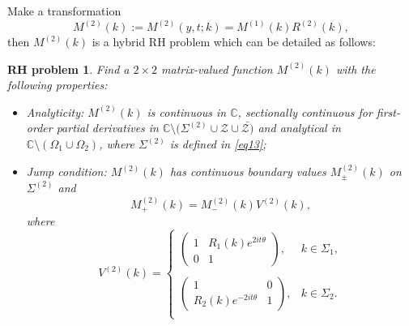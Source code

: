 \documentclass[11pt]{article}
\numberwithin{equation}{section}
\newtheorem{RHP}{RH problem}
\begin{document}
Make  a transformation
\begin{equation} M^{(2)}(k):=M^{(2)}(y,t;k)=M^{(1)}(k)R^{(2)}(k),\label{eq17}
\end{equation}
then $M^{(2)}(k)$ is a hybrid RH problem which can be detailed as follows:

\begin{RHP}\label{rhp4}
    Find a $2\times 2$ matrix-valued function $M^{(2)}(k)$ with the following properties:
\begin{itemize}
  \item Analyticity: $M^{(2)}(k)$ is continuous in $\mathbb{C}$, sectionally continuous for first-order partial derivatives in $\mathbb{C}\setminus(\Sigma^{(2)}\cup\mathcal{Z}\cup\bar{\mathcal{Z})}$  and analytical in $\mathbb{C}\setminus(\Omega_1\cup\Omega_2)$, where $\Sigma^{(2)}$ is defined in \eqref{eq13};
  \item Jump condition: $M^{(2)}(k)$ has continuous boundary values $M^{(2)}_{\pm}(k)$ on $\Sigma^{(2)}$ and
 \begin{equation*}
M^{(2)}_+(k)=M^{(2)}_-(k)V^{(2)}(k),
\end{equation*}
where
\begin{equation}\label{eq14}
V^{(2)}(k)=\left\{\begin{array}{lll}
\left(\begin{array}{cc}
1 & R_{1}(k)e^{2it\theta}\\
0 & 1
\end{array}\right), & k\in \Sigma_{1},\\
\\
\left(\begin{array}{cc}
1 & 0\\
R_{2}(k)e^{-2it\theta} & 1
\end{array}\right),  &k\in \Sigma_{2}.\\

\end{array}\right.
\end{equation}


\end{itemize}
\end{RHP}
\end{document}
